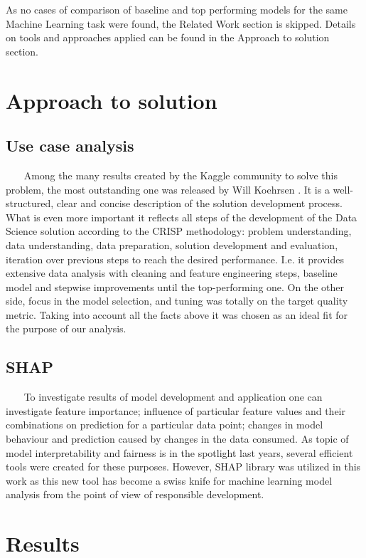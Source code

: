    As no cases of comparison of baseline and top performing models for the same Machine Learning task were found, the Related Work section is skipped. Details on tools and approaches applied can be found in the Approach to solution section.
    
\section{Approach to solution}
\subsection{Use case analysis}~~~
    Among the many results created by the Kaggle community to solve this problem, the most outstanding one was released by Will Koehrsen \cite{kaggle_2}. It is a well-structured, clear and concise description of the solution development process. What is even more important it reflects all steps of the development of the Data Science solution according to the CRISP methodology: problem understanding, data understanding, data preparation, solution development and evaluation, iteration over previous steps to reach the desired performance. I.e. it provides extensive data analysis with cleaning and feature engineering steps, baseline model and stepwise improvements until the top-performing one. On the other side, focus in the model selection, and tuning was totally on the target quality metric. Taking into account all the facts above it was chosen as an ideal fit for the purpose of our analysis.
    
\subsection{SHAP}~~~
    To investigate results of model development and application one can investigate feature importance; influence of particular feature values and their combinations on prediction for a particular data point; changes in model behaviour and prediction caused by changes in the data consumed. As topic of model interpretability and fairness is in the spotlight last years, several efficient tools were created for these purposes. However, SHAP \cite{NIPS2017_7062} library was utilized in this work as this new tool has become a swiss knife for machine learning model analysis from the point of view of responsible development.
    
\section{Results}~~~

